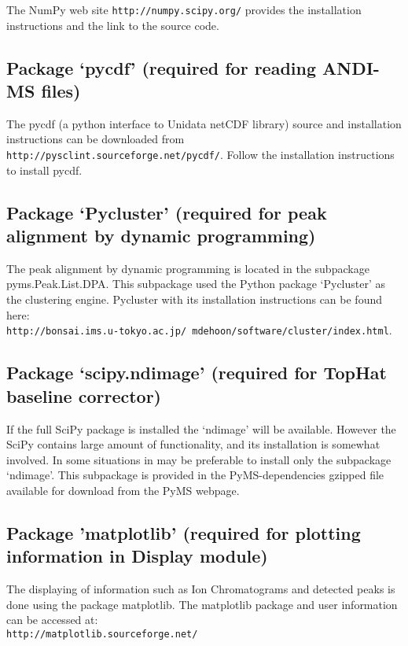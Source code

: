 The NumPy web site {\tt http://numpy.scipy.org/} provides the installation
instructions and the link to the source code.

\subsection{\label{subsec:pycdf}Package `pycdf' (required for reading
ANDI-MS files)}

The pycdf (a python interface to Unidata netCDF library) source and
installation instructions can be downloaded from\\
{\tt http://pysclint.sourceforge.net/pycdf/}. Follow the installation
instructions to install pycdf.

\subsection{\label{subsec:pycluster}Package `Pycluster' (required for peak
alignment by dynamic programming)}

The peak alignment by dynamic programming is located in the subpackage
pyms.Peak.List.DPA. This subpackage used the Python package `Pycluster'
as the clustering engine. Pycluster with its installation instructions
can be found here:\\
{\tt http://bonsai.ims.u-tokyo.ac.jp/~mdehoon/software/cluster/index.html}.

\subsection{\label{subsec:scipy-ndmage}Package `scipy.ndimage' (required
for TopHat baseline corrector)}

If the full SciPy package is installed the `ndimage' will be available. However
the SciPy contains large amount of functionality, and its installation is
somewhat involved. In some situations in may be preferable to install only
the subpackage `ndimage'. This subpackage is provided in the PyMS-dependencies gzipped
file available for download from the PyMS webpage.

\subsection{\label{subsec:matplotlib}Package 'matplotlib' (required 
for plotting information in Display module)}

The displaying of information such as Ion Chromatograms and detected peaks
is done using the package matplotlib. The matplotlib package and user information
can be accessed at:\\
{\tt http://matplotlib.sourceforge.net/}

